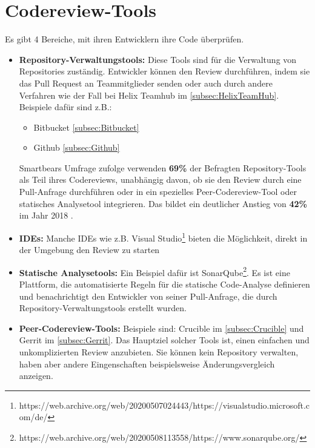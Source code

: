 \section{Codereview-Tools}
\label{sec:Coderview-Tools}

Es gibt 4 Bereiche, mit ihren Entwicklern ihre Code überprüfen.

\begin{itemize}
	\item \textbf{Repository-Verwaltungstools:} Diese Tools sind für die Verwaltung von Repositories zuständig. Entwickler können den Review durchführen, indem sie das Pull Request an 				Teammitglieder senden oder auch durch andere Verfahren wie der Fall bei Helix Teamhub im \cref{subsec:HelixTeamHub}.
		Beispiele dafür sind z.B.:
		\begin{itemize}
			\item Bitbucket \cref{subsec:Bitbucket}
			\item Github \cref{subsec:Github}
		\end{itemize}
		
		Smartbears Umfrage zufolge verwenden \textbf{69\%} der Befragten Repository-Tools als Teil ihres Codereviews, unabhängig davon, ob sie den Review durch eine Pull-Anfrage 					durchführen oder in ein spezielles Peer-Codereview-Tool oder statisches Analysetool integrieren. Das bildet ein deutlicher Anstieg von \textbf{42\%} im Jahr 2018 							\cite{smartbear}.

	\item \textbf{IDEs:} Manche IDEs wie z.B. Visual Studio\footnote{https://web.archive.org/web/20200507024443/https://visualstudio.microsoft.com/de/} bieten die Möglichkeit, direkt in 		der Umgebung den Review zu starten

	\item \textbf{Statische Analysetools:} Ein Beispiel dafür ist SonarQube\footnote{https://web.archive.org/web/20200508113558/https://www.sonarqube.org/}. Es ist eine Plattform, die 			automatisierte Regeln für die statische Code-Analyse definieren und benachrichtigt den Entwickler von seiner Pull-Anfrage, die durch Repository-Verwaltungstools erstellt wurden.

	\item \textbf{Peer-Codereview-Tools:} Beispiele sind: Crucible im \cref{subsec:Crucible} und Gerrit im \cref{subsec:Gerrit}. Das Hauptziel solcher Tools ist, einen einfachen und 				unkomplizierten Review anzubieten. Sie können kein Repository verwalten, haben aber andere Eingenschaften beispielsweise Änderungsvergleich anzeigen.
\end{itemize}

